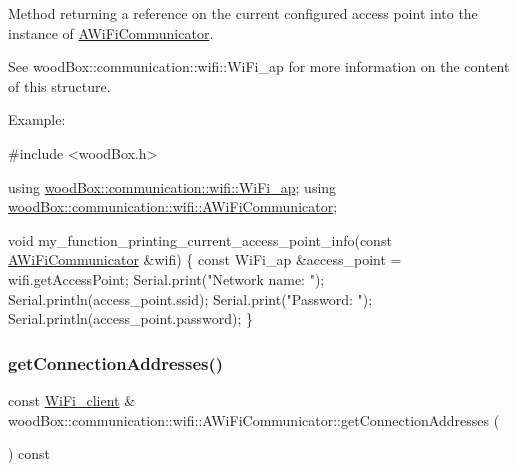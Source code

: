 Method returning a reference on the current configured access point into the instance of \mbox{\hyperlink{classwood_box_1_1communication_1_1wifi_1_1_a_wi_fi_communicator}{A\+Wi\+Fi\+Communicator}}.

See wood\+Box\+::communication\+::wifi\+::\+Wi\+Fi\+\_\+ap for more information on the content of this structure.

Example\+:


\begin{DoxyCode}
\textcolor{preprocessor}{#include <woodBox.h>}

\textcolor{keyword}{using} \mbox{\hyperlink{structwood_box_1_1communication_1_1wifi_1_1s__wifi__access__point}{woodBox::communication::wifi::WiFi\_ap}};
\textcolor{keyword}{using} \mbox{\hyperlink{classwood_box_1_1communication_1_1wifi_1_1_a_wi_fi_communicator}{woodBox::communication::wifi::AWiFiCommunicator}};

\textcolor{keywordtype}{void} my\_function\_printing\_current\_access\_point\_info(\textcolor{keyword}{const} \mbox{\hyperlink{classwood_box_1_1communication_1_1wifi_1_1_a_wi_fi_communicator_a9d1dc13ca9243170b04211bef2b86ed2}{AWiFiCommunicator}} &wifi) \{
  \textcolor{keyword}{const} WiFi\_ap &access\_point = wifi.getAccessPoint;
  Serial.print(\textcolor{stringliteral}{"Network name: "});
  Serial.println(access\_point.ssid);
  Serial.print(\textcolor{stringliteral}{"Password: "});
  Serial.println(access\_point.password);
\}
\end{DoxyCode}
 \mbox{\label{classwood_box_1_1communication_1_1wifi_1_1_a_wi_fi_communicator_a9b0669461151786a0c70fbb1c1a07bc7}} 
\subsubsection{\texorpdfstring{get\+Connection\+Addresses()}{getConnectionAddresses()}}
{\footnotesize\ttfamily const \mbox{\hyperlink{structwood_box_1_1communication_1_1wifi_1_1s__wifi__client}{Wi\+Fi\+\_\+client}} \& wood\+Box\+::communication\+::wifi\+::\+A\+Wi\+Fi\+Communicator\+::get\+Connection\+Addresses (\begin{DoxyParamCaption}{ }\end{DoxyParamCaption}) const}

